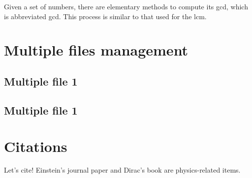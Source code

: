 Given a set of numbers, there are elementary methods to compute 
its \ac{gcd}, which is abbreviated gcd. This 
process is similar to that used for the lcm.

\chapter{Multiple files management}
\section{Multiple file 1}


\section{Multiple file 1}



\chapter{Citations}

Let's cite! Einstein's journal paper \cite{einstein} and Dirac's
book \cite{dirac} are physics-related items.






